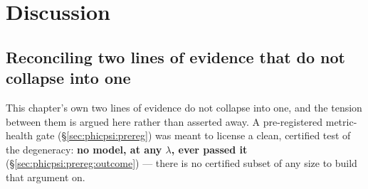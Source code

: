 \section{Discussion}
\label{sec:phicpsi:discussion}

\subsection{Reconciling two lines of evidence that do not collapse into one}
\label{sec:phicpsi:reconcile}

This chapter's own two lines of evidence do not collapse into one, and the tension between them is argued here rather than asserted away.
A pre-registered metric-health gate (\S\ref{sec:phicpsi:prereg}) was meant to license a clean, certified test of the degeneracy: \textbf{no model, at any $\lambda$, ever passed it} (\S\ref{sec:phicpsi:prereg:outcome}) --- there is no certified subset of any size to build that argument on.

